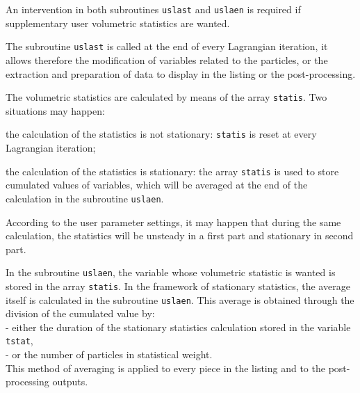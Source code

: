 {{%
%

\noindent
An intervention in both subroutines \texttt{uslast} and \texttt{uslaen}
is required if supplementary user volumetric statistics are wanted.

\noindent
The subroutine \texttt{uslast} is called at the end of every Lagrangian
iteration, it allows therefore the modification of variables related to
the particles, or the extraction and preparation of data to display in
the listing or the post-processing.


\noindent
The volumetric statistics are calculated by means of the array \texttt{statis}. Two
situations may happen:
\begin{list}{-}{}
\item the calculation of the statistics is not stationary: \texttt{statis} is
      reset at every Lagrangian iteration;
\item the calculation of the statistics is stationary: the array
      \texttt{statis} is used to store cumulated values of variables, which will
      be averaged at the end of the calculation in the subroutine
      \texttt{uslaen}.
\end{list}

According to the user parameter settings, it may happen that during the
same calculation, the statistics will be unsteady in a first part and
stationary in second part.

\noindent
In the subroutine \texttt{uslaen}, the variable whose volumetric statistic is wanted is
stored in the array \texttt{statis}. In the framework of stationary statistics,
the average itself is calculated in the subroutine \texttt{uslaen}. This
average is obtained through the division of the cumulated value by: \\
\hspace*{1cm}- either the duration of the stationary statistics
     calculation stored in the variable \texttt{tstat}, \\
\hspace*{1cm}- or the number of particles in statistical weight. \\
This method of averaging is applied to every piece in the listing and
     to the post-processing outputs.

}}
